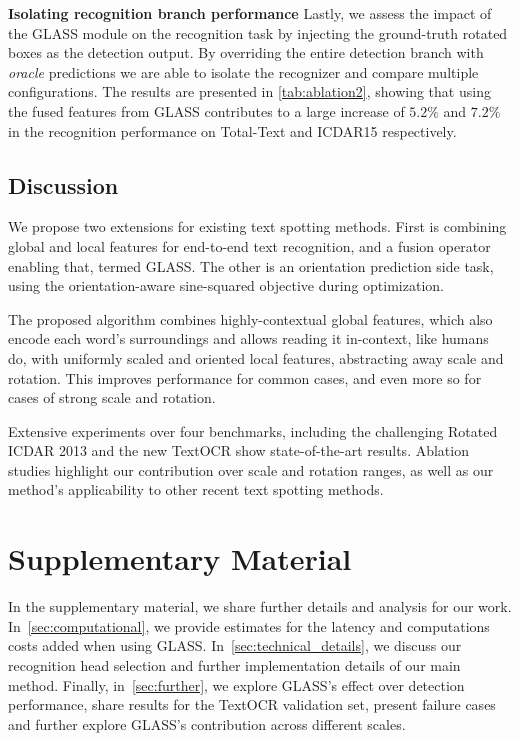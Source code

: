 \documentclass[runningheads]{llncs}
\begin{document}
\noindent \textbf{Isolating recognition branch performance}
Lastly, we assess the impact of the GLASS module on the recognition task by injecting the ground-truth rotated boxes as the detection output.
By overriding the entire detection branch with \emph{oracle} predictions we are able to isolate the recognizer and compare multiple configurations.
The results are presented in \cref{tab:ablation2}, showing that using the fused features from GLASS contributes to a large increase of $5.2\%$ and $7.2\%$ in the recognition performance on Total-Text and ICDAR15 respectively.
 

\section{Discussion}
\label{sec:discussion}

We propose two extensions for existing text spotting methods. First is combining global and local features for end-to-end text recognition, and a fusion operator enabling that, termed GLASS.
The other is an orientation prediction side task, using the orientation-aware sine-squared objective during optimization.

The proposed algorithm combines highly-contextual global features, which also encode each word's surroundings and allows reading it in-context, like humans do, with uniformly scaled and oriented local features, abstracting away scale and rotation. This improves performance for common cases, and even more so for cases of strong scale and rotation.

Extensive experiments over four benchmarks, including the challenging Rotated ICDAR 2013 and the new TextOCR show state-of-the-art results.
Ablation studies highlight our contribution over scale and rotation ranges, as well as our method's applicability to other recent text spotting methods.
 
\clearpage







\chapter*{Supplementary Material}




In the supplementary material, we share further details and analysis for our work.
In~\cref{sec:computational}, we provide estimates for the latency and computations costs added when using GLASS.
In~\cref{sec:technical_details}, we discuss our recognition head selection and further implementation details of our main method.
Finally, in~\cref{sec:further}, we explore GLASS's effect over detection performance, share results for the TextOCR validation set, present failure cases and further explore GLASS's contribution across different scales.
\end{document}
